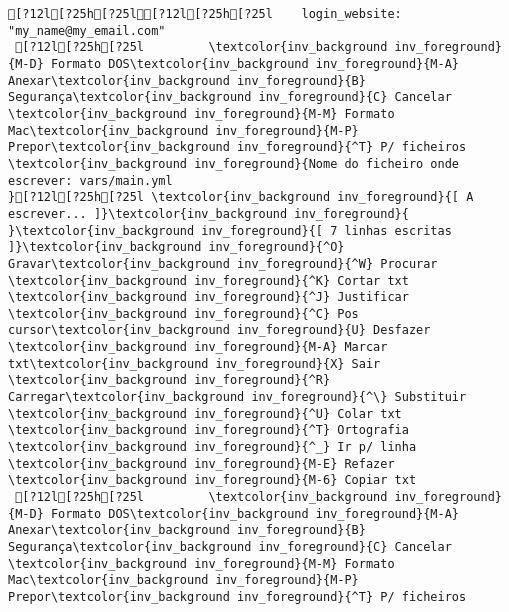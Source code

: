 \documentclass{scrartcl}
\begin{document}
\begin{Verbatim}
[?12l[?25h[?25l[?12l[?25h[?25l    login_website: "my_name@my_email.com"
 [?12l[?25h[?25l         \textcolor{inv_background inv_foreground}{M-D} Formato DOS\textcolor{inv_background inv_foreground}{M-A} Anexar\textcolor{inv_background inv_foreground}{B} Segurança\textcolor{inv_background inv_foreground}{C} Cancelar           \textcolor{inv_background inv_foreground}{M-M} Formato Mac\textcolor{inv_background inv_foreground}{M-P} Prepor\textcolor{inv_background inv_foreground}{^T} P/ ficheiros
\textcolor{inv_background inv_foreground}{Nome do ficheiro onde escrever: vars/main.yml                                                                                             }[?12l[?25h[?25l \textcolor{inv_background inv_foreground}{[ A escrever... ]}\textcolor{inv_background inv_foreground}{          }\textcolor{inv_background inv_foreground}{[ 7 linhas escritas ]}\textcolor{inv_background inv_foreground}{^O} Gravar\textcolor{inv_background inv_foreground}{^W} Procurar      \textcolor{inv_background inv_foreground}{^K} Cortar txt    \textcolor{inv_background inv_foreground}{^J} Justificar    \textcolor{inv_background inv_foreground}{^C} Pos cursor\textcolor{inv_background inv_foreground}{U} Desfazer     \textcolor{inv_background inv_foreground}{M-A} Marcar txt\textcolor{inv_background inv_foreground}{X} Sair    \textcolor{inv_background inv_foreground}{^R} Carregar\textcolor{inv_background inv_foreground}{^\} Substituir    \textcolor{inv_background inv_foreground}{^U} Colar txt     \textcolor{inv_background inv_foreground}{^T} Ortografia    \textcolor{inv_background inv_foreground}{^_} Ir p/ linha   \textcolor{inv_background inv_foreground}{M-E} Refazer      \textcolor{inv_background inv_foreground}{M-6} Copiar txt
 [?12l[?25h[?25l         \textcolor{inv_background inv_foreground}{M-D} Formato DOS\textcolor{inv_background inv_foreground}{M-A} Anexar\textcolor{inv_background inv_foreground}{B} Segurança\textcolor{inv_background inv_foreground}{C} Cancelar           \textcolor{inv_background inv_foreground}{M-M} Formato Mac\textcolor{inv_background inv_foreground}{M-P} Prepor\textcolor{inv_background inv_foreground}{^T} P/ ficheiros

\end{Verbatim}
\end{document}
